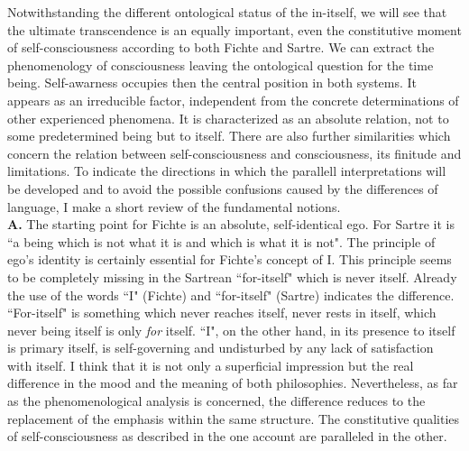 Notwithstanding the different ontological status of the in-itself, we will see that the ultimate transcendence is an
equally important, even the constitutive moment of self-consciousness according to both Fichte and Sartre. We can 
extract the phenomenology of consciousness leaving the ontological question for the time being. Self-awarness 
occupies then the central position in both systems. It appears as an irreducible factor, independent from the 
concrete determinations of other experienced phenomena. It is characterized as an absolute relation, not to some 
predetermined being but to itself. There are also further similarities which concern the relation between self-consciousness and consciousness, its finitude and limitations. 
To indicate the directions in which the parallell
interpretations will be developed and to avoid  the possible confusions caused by the 
differences of language, I 
make a short review of the fundamental notions.\\[1ex]
{\bf A.} The starting point for Fichte is an absolute, self-identical ego. For Sartre it is ``a being which is not what it is 
and which is what it is not". The principle of ego's identity is certainly
essential for Fichte's concept of I. This principle seems to be completely missing in the Sartrean ``for-itself" which is
never itself. Already the use of the words ``I" (Fichte) and ``for-itself" (Sartre) indicates the difference. ``For-itself" 
is something which never reaches itself, never rests in itself, which never being itself is only {\em for} itself. ``I", on the 
other hand, in its presence to itself is primary itself, is self-governing and undisturbed by any lack of satisfaction 
with itself. I think that it is not only a superficial impression but the real difference in the mood and the meaning 
of both philosophies. Nevertheless, as far as the phenomenological analysis is concerned, 
the difference reduces to the 
replacement of the emphasis within the same structure. The constitutive qualities of self-consciousness as described 
in the one account are paralleled in the other.

